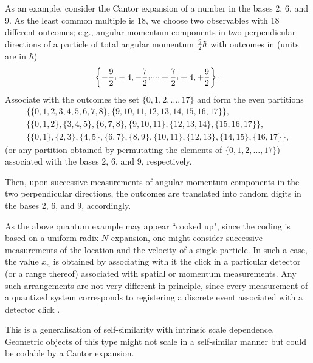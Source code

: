 \documentclass{elsart}
\begin{document}
As an example, consider the Cantor expansion of a number in the bases
 2, 6, and 9. As the  least common multiple is 18, we choose two
observables with 18 different outcomes; e.g., angular momentum
components in two perpendicular directions of a particle of total
angular
momentum  ${9\over 2} \hbar$ with outcomes in  (units are in $\hbar$)
$$\left\{ -{9\over 2} \raisebox{.4ex}{,}-4,-{7\over 2}
\raisebox{.4ex}{,}
\raisebox{.4ex}{.}\raisebox{.4ex}{.}\raisebox{.4ex}{.,} +{7\over 2} \raisebox{.4ex}{,} +4,+{9\over
2}\right\} \raisebox{.4ex}{.}$$
Associate with the outcomes the set
$\{0,1,2,\ldots ,17\}$
and form the even partitions
\begin{eqnarray}
&\{\{0,1,2,3,4,5,6,7,8\},\{9,10,11,12,13,14,15,16,17\}\},&\nonumber  \\
&\{\{0,1,2\},\{3,4,5\},\{6,7,8\},\{9,10,11\},\{12,13,14\},\{15,16,17\}\},&\nonumber  \\
&\{\{0,1\},\{2,3\},\{4,5\},\{6,7\},\{8,9\},\{10,11\},\{12,13\},\{14,15\},\{1
6,17\}\},&\nonumber
\end{eqnarray}
(or any partition obtained by permutating the elements of $\{0,1,2,\ldots
,17\}$)
associated with the bases  2, 6, and 9, respectively.

Then, upon successive measurements of angular momentum
components in the two perpendicular directions,
the outcomes  are translated into random digits in the bases  2, 6, and 9,
accordingly.


As the above quantum example may appear   ``cooked up",  since  the
coding is based on a uniform radix $N$ expansion, one
might consider successive measurements of the location and the velocity of
a single particle. In such a case, the value $x_n$ is obtained by
associating with it
the click in a particular detector (or a range thereof) associated with
spatial or momentum measurements. Any such arrangements are not very
different in principle, since every measurement of a quantized system
corresponds to registering a discrete event associated with a detector
click \cite{sum-3}.




This is a generalisation of self-similarity with intrinsic scale dependence.
Geometric objects of this type might not scale in a self-similar manner
but could be codable by a Cantor expansion.
\end{document}
